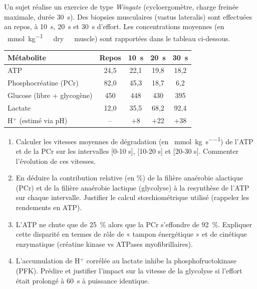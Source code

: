 \documentclass[11pt]{article}
\begin{document}
\begin{exercice}
Un sujet réalise un exercice de type \textit{Wingate} (cycloergomètre, charge freinée maximale, durée \SI{30}{\second}). Des biopsies musculaires (vastus lateralis) sont effectuées au repos, à \SI{10}{\second}, \SI{20}{\second} et \SI{30}{\second} d'effort. Les concentrations moyennes (en \SI{}{\milli\mole\per\kilo\gram\ dry\ muscle}) sont rapportées dans le tableau ci-dessous.

\begin{center}
\begin{tabular}{lcccc}
\toprule
Métabolite & Repos & \SI{10}{\second} & \SI{20}{\second} & \SI{30}{\second} \\
\midrule
ATP & 24,5 & 22,1 & 19,8 & 18,2 \\
Phosphocréatine (PCr) & 82,0 & 45,3 & 18,7 & 6,2 \\
Glucose (libre + glycogène) & 450 & 448 & 430 & 395 \\
Lactate & 12,0 & 35,5 & 68,2 & 92,4 \\
H$^+$ (estimé via pH) & -- & +8 & +22 & +38 \\
\bottomrule
\end{tabular}
\end{center}

\begin{enumerate}
    \item Calculer les vitesses moyennes de dégradation (en \SI{}{\milli\mole\per\kilo\gram\per\second}) de l'ATP et de la PCr sur les intervalles [0-10 s], [10-20 s] et [20-30 s]. Commenter l'évolution de ces vitesses.
    \item En déduire la contribution relative (en \%) de la filière anaérobie alactique (PCr) et de la filière anaérobie lactique (glycolyse) à la resynthèse de l'ATP sur chaque intervalle. Justifier le calcul stœchiométrique utilisé (rappeler les rendements en ATP).
    \item L'ATP ne chute que de \SI{25}{\%} alors que la PCr s'effondre de \SI{92}{\%}. Expliquer cette disparité en termes de rôle de « tampon énergétique » et de cinétique enzymatique (créatine kinase vs ATPases myofibrillaires).
    \item L'accumulation de H$^+$ corrélée au lactate inhibe la phosphofructokinase (PFK). Prédire et justifier l'impact sur la vitesse de la glycolyse si l'effort était prolongé à \SI{60}{\second} à puissance identique.
\end{enumerate}
\end{exercice}
\end{document}
